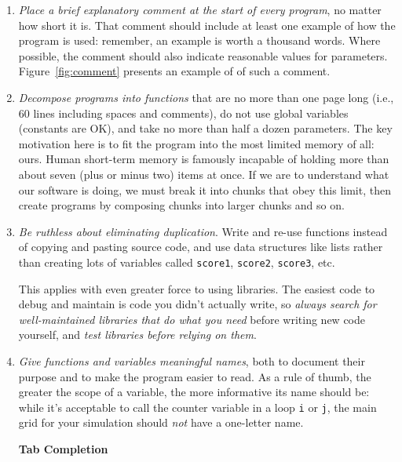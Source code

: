 \documentclass[10pt]{article}
\newcommand{\recommend}[1]{\textit{#1}}
\begin{document}
\begin{enumerate}

\item  
  \recommend{Place a brief explanatory comment at the start of every
    program}, no matter how short it is. That comment should include
  at least one example of how the program is used: remember, an
  example is worth a thousand words. Where possible, the comment
  should also indicate reasonable values for parameters.
  Figure~\ref{fig:comment} presents an example of of such a comment.

\item
  \recommend{Decompose programs into functions} that are no more than
  one page long (i.e., 60 lines including spaces and comments), do not
  use global variables (constants are OK), and take no more than half
  a dozen parameters.  The key motivation here is to fit the program
  into the most limited memory of all: ours. Human short-term memory
  is famously incapable of holding more than about seven (plus or
  minus two) items at once. If we are to understand what our software
  is doing, we must break it into chunks that obey this limit, then
  create programs by composing chunks into larger chunks and so on.

\item
  \recommend{Be ruthless about eliminating duplication}. Write and
  re-use functions instead of copying and pasting source code, and use
  data structures like lists rather than creating lots of variables
  called \texttt{score1}, \texttt{score2}, \texttt{score3}, etc.

  This applies with even greater force to using libraries. The easiest
  code to debug and maintain is code you didn't actually write, so
  \recommend{always search for well-maintained libraries that do what
    you need} before writing new code yourself, and \recommend{test
    libraries before relying on them}.

\item
  \recommend{Give functions and variables meaningful names}, both to
  document their purpose and to make the program easier to read. As a
  rule of thumb, the greater the scope of a variable, the more
  informative its name should be: while it's acceptable to call the
  counter variable in a loop \texttt{i} or \texttt{j}, the main grid
  for your simulation should \emph{not} have a one-letter name.

  \begin{framed}
    \noindent \textbf{Tab Completion}


\end{framed}
\end{enumerate}
\end{document}
